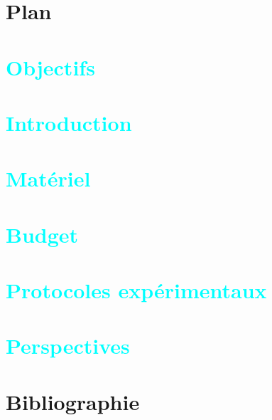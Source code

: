 \documentclass{article}
\begin{document}


\section*{Plan}


\section*{\textcolor{cyan}{Objectifs}}


\section*{\textcolor{cyan}{Introduction}}


\section*{\textcolor{cyan}{Matériel}}


\section*{\textcolor{cyan}{Budget}}


\section*{\textcolor{cyan}{Protocoles expérimentaux}}


\section*{\textcolor{cyan}{Perspectives}}


\section*{Bibliographie}
\end{document}
